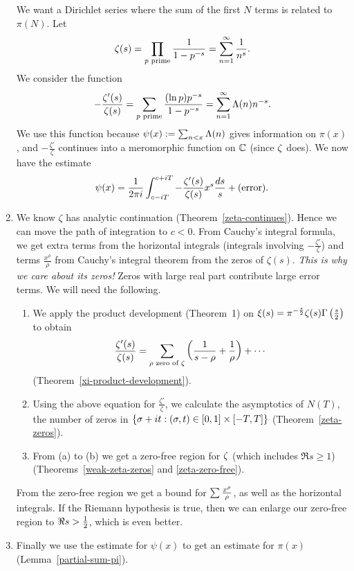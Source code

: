\begin{enumerate}
We want a Dirichlet series where the sum of the first $N$ terms is related to $\pi(N)$.
Let
\[
\zeta(s)=\prod_{p\text{ prime}} \frac{1}{1-p^{-s}}=\sum_{n=1}^{\infty}\frac{1}{n^s}.
\]
We consider the function
\[
-\frac{\zeta'(s)}{\zeta(s)}=\sum_{p\text{ prime}} \frac{(\ln p)p^{-s}}{1-p^{-s}}
=\sum_{n=1}^{\infty} \Lambda(n)n^{-s}.
\]
We use this function because $\psi(x):=\sum_{n<x} \Lambda(n)$ gives information on $\pi(x)$, and 
$-\frac{\zeta'}{\zeta}$ continues into a meromorphic function on $\mathbb{C}$ (since $\zeta$ does). We now have the estimate
\[
\psi(x)=\frac{1}{2\pi i}\int_{c-iT}^{c+iT} -\frac{\zeta'(s)}{\zeta(s)} x^s\frac{ds}{s}+(\text{error}).
\]
\item We know $\zeta$ has analytic continuation (Theorem~\ref{zeta-continues}). Hence we can move the path of integration to $c<0$. From Cauchy's integral formula, we get extra terms from the horizontal integrals (integrals involving $-\frac{\zeta'}{\zeta}$) and terms $\frac{x^{\rho}}{\rho}$ from Cauchy's integral theorem from the zeros of $\zeta(s)$. {\it This is why we care about its zeros!} Zeros with large real part contribute large error terms.
We will need the following.
\begin{enumerate}
\item
We apply the product development (Theorem~1) on $\xi(s)=\pi^{-\frac s2}\zeta(s)\Gamma\left( {\frac{s}{2}} \right)$ to obtain
\[
\frac{\zeta'(s)}{\zeta(s)}=\sum_{\rho\text{ zero of }\zeta}\left( {\frac{1}{s-\rho}+\frac{1}{\rho}} \right)+\cdots
\]
(Theorem~\ref{xi-product-development}).
\item
Using the above equation for $\frac{\zeta'}{\zeta}$, we calculate the asymptotics of $N(T)$, the number of zeros in $\left\{{\sigma+it}:{(\sigma,t)\in[0,1]\times[-T,T]}\right\}$ (Theorem~\ref{zeta-zeros}).
\item
From (a) to (b) we get a zero-free region for $\zeta$ (which includes $\Re s\ge 1$) (Theorems~\ref{weak-zeta-zeros} and \ref{zeta-zero-free}).
\end{enumerate}
From the zero-free region we get a bound for $\sum\frac{x^{\rho}}{\rho}$, as well as the horizontal integrals. 
If the Riemann hypothesis is true, then we can enlarge our zero-free region to $\Re s> \frac{1}{2}$, which is even better. 
\item Finally we use the estimate for $\psi(x)$ to get an estimate for $\pi(x)$ (Lemma~\ref{partial-sum-pi}).
\end{enumerate}
